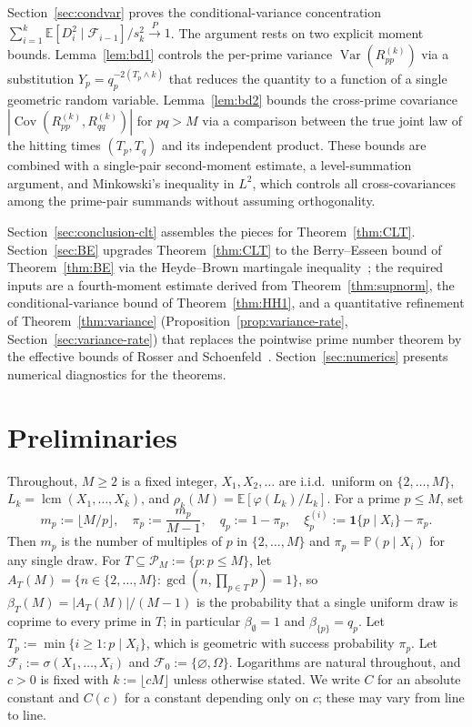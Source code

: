 \documentclass[11pt]{article}
\theoremstyle{remark}
\newcommand{\lcm}{\operatorname{lcm}}
\newcommand{\gcdop}{\operatorname{gcd}}
\newcommand{\PP}{\mathbb{P}}
\newcommand{\EE}{\mathbb{E}}
\newcommand{\F}{\mathcal{F}}
\newcommand{\one}{\mathbf{1}}
\newcommand{\PM}{\mathcal{P}_M}
\DeclareMathOperator{\Var}{Var}
\DeclareMathOperator{\Cov}{Cov}
\begin{document}
Section~\ref{sec:condvar} proves the conditional-variance concentration $\sum_{i=1}^k \EE[D_i^2 \mid \F_{i-1}]/s_k^2 \xrightarrow{P} 1$. The argument rests on two explicit moment bounds. Lemma~\ref{lem:bd1} controls the per-prime variance $\Var(R_{pp}^{(k)})$ via a substitution $Y_p = q_p^{-2(T_p \wedge k)}$ that reduces the quantity to a function of a single geometric random variable. Lemma~\ref{lem:bd2} bounds the cross-prime covariance $|\Cov(R_{pp}^{(k)}, R_{qq}^{(k)})|$ for $pq > M$ via a comparison between the true joint law of the hitting times $(T_p, T_q)$ and its independent product. These bounds are combined with a single-pair second-moment estimate, a level-summation argument, and Minkowski's inequality in $L^2$, which controls all cross-covariances among the prime-pair summands without assuming orthogonality.

Section~\ref{sec:conclusion-clt} assembles the pieces for Theorem~\ref{thm:CLT}. Section~\ref{sec:BE} upgrades Theorem~\ref{thm:CLT} to the Berry--Esseen bound of Theorem~\ref{thm:BE} via the Heyde--Brown martingale inequality~\cite{HeydeBrown}; the required inputs are a fourth-moment estimate derived from Theorem~\ref{thm:supnorm}, the conditional-variance bound of Theorem~\ref{thm:HH1}, and a quantitative refinement of Theorem~\ref{thm:variance} (Proposition~\ref{prop:variance-rate}, Section~\ref{sec:variance-rate}) that replaces the pointwise prime number theorem by the effective bounds of Rosser and Schoenfeld~\cite{RosserSchoenfeld1962}. Section~\ref{sec:numerics} presents numerical diagnostics for the theorems.

\section{Preliminaries}\label{sec:prelim}

Throughout, $M \geq 2$ is a fixed integer, $X_1, X_2, \ldots$ are i.i.d.\ uniform on $\{2, \ldots, M\}$, $L_k = \lcm(X_1, \ldots, X_k)$, and $\rho_k(M) = \EE[\varphi(L_k)/L_k]$. For a prime $p \leq M$, set
\[
m_p := \lfloor M/p \rfloor, \quad \pi_p := \frac{m_p}{M-1}, \quad q_p := 1 - \pi_p, \quad \xi_p^{(i)} := \one\{p \mid X_i\} - \pi_p.
\]
Then $m_p$ is the number of multiples of $p$ in $\{2, \ldots, M\}$ and $\pi_p = \PP(p \mid X_i)$ for any single draw. For $T \subseteq \PM := \{p : p \leq M\}$, let $A_T(M) = \{n \in \{2, \ldots, M\} : \gcdop(n, \prod_{p \in T} p) = 1\}$, so $\beta_T(M) = |A_T(M)|/(M-1)$ is the probability that a single uniform draw is coprime to every prime in $T$; in particular $\beta_\emptyset = 1$ and $\beta_{\{p\}} = q_p$. Let $T_p := \min\{i \geq 1 : p \mid X_i\}$, which is geometric with success probability $\pi_p$. Let $\F_i := \sigma(X_1, \ldots, X_i)$ and $\F_0 := \{\varnothing, \Omega\}$. Logarithms are natural throughout, and $c > 0$ is fixed with $k := \lfloor cM \rfloor$ unless otherwise stated. We write $C$ for an absolute constant and $C(c)$ for a constant depending only on $c$; these may vary from line to line.
\end{document}
